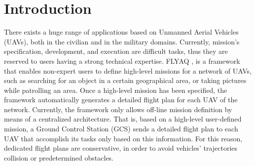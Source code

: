 \documentclass[letterpaper, 10 pt, conference]{ieeeconf}
\begin{document}
\section{Introduction}\label{sec:Introduction}
There exists a huge range of applications based on Unmanned Aerial Vehicles (UAVs), both in the civilian and in the military domains.
Currently, mission's specification, development, and execution are difficult tasks, thus they are reserved to users having a strong technical expertise.
%
FLYAQ \cite{FlyAQ:2015},\cite{FLYAQ:2016} is a framework that enables non-expert users to define high-level missions for a network of UAVs, such as searching for an object in a certain geographical area, or taking pictures while patrolling an area. Once a high-level mission has been specified, the framework automatically generates a detailed flight plan for each UAV of the network. 
%
Currently, the framework only allows off-line mission definition by means of a centralized architecture. That is, based on a high-level user-defined mission, a Ground Control Station (GCS) sends a detailed flight plan to each UAV that accomplish its tasks only based on this information. 
For this reason, dedicated flight plans are conservative, in order to avoid vehicles' trajectories collision or predetermined obstacles.
\end{document}
